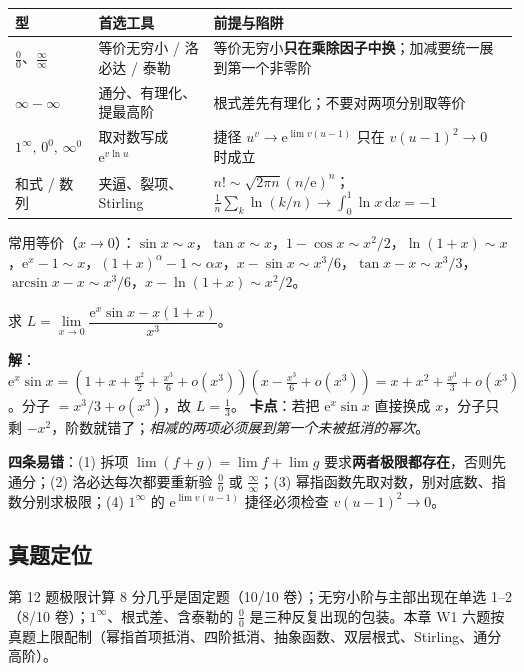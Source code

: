 \documentclass[11pt,a4paper]{ctexart}
\newcommand{\ee}{\mathrm{e}}
\newcommand{\D}{\mathrm{d}}
\begin{document}
\begin{center}
\begin{tabular}{@{}p{3.1cm}p{5.1cm}p{7.0cm}@{}}
\toprule
\textbf{型} & \textbf{首选工具} & \textbf{前提与陷阱} \\
\midrule
$\tfrac00$、$\tfrac{\infty}{\infty}$ & 等价无穷小 / 洛必达 / 泰勒 & 等价无穷小\textbf{只在乘除因子中换}；加减要统一展到第一个非零阶 \\
$\infty-\infty$ & 通分、有理化、提最高阶 & 根式差先有理化；不要对两项分别取等价 \\
$1^\infty,\,0^0,\,\infty^0$ & 取对数写成 $\ee^{v\ln u}$ & 捷径 $u^v\to\ee^{\lim v(u-1)}$ 只在 $v(u-1)^2\to0$ 时成立 \\
和式 / 数列 & 夹逼、裂项、Stirling & $n!\sim\sqrt{2\pi n}(n/\ee)^n$；$\frac1n\sum_k\ln(k/n)\to\int_0^1\ln x\,\D x=-1$ \\
\bottomrule
\end{tabular}
\end{center}

常用等价（$x\to0$）：$\sin x\sim x$，$\tan x\sim x$，$1-\cos x\sim x^2/2$，$\ln(1+x)\sim x$，$\ee^x-1\sim x$，$(1+x)^\alpha-1\sim\alpha x$，$x-\sin x\sim x^3/6$，$\tan x-x\sim x^3/3$，$\arcsin x-x\sim x^3/6$，$x-\ln(1+x)\sim x^2/2$。

\begin{keypoint}
求 $L=\lim\limits_{x\to0}\dfrac{\ee^{x}\sin x-x(1+x)}{x^{3}}$。

\noindent\textbf{解}：$\ee^x\sin x=(1+x+\frac{x^2}{2}+\frac{x^3}{6}+o(x^3))(x-\frac{x^3}{6}+o(x^3))
=x+x^{2}+\frac{x^{3}}{3}+o(x^{3})$。分子 $=x^{3}/3+o(x^{3})$，故 $L=\boxed{\tfrac13}$。
\textbf{卡点}：若把 $\ee^x\sin x$ 直接换成 $x$，分子只剩 $-x^2$，阶数就错了；\emph{相减的两项必须展到第一个未被抵消的幂次}。
\end{keypoint}

\noindent\textbf{四条易错}：(1) 拆项 $\lim(f+g)=\lim f+\lim g$ 要求\textbf{两者极限都存在}，否则先通分；(2) 洛必达每次都要重新验 $\tfrac00$ 或 $\tfrac{\infty}{\infty}$；(3) 幂指函数先取对数，别对底数、指数分别求极限；(4) $1^\infty$ 的 $\ee^{\lim v(u-1)}$ 捷径必须检查 $v(u-1)^2\to0$。

\subsection{真题定位}
第 12 题极限计算 8 分几乎是固定题（10/10 卷）；无穷小阶与主部出现在单选 1--2（8/10 卷）；$1^\infty$、根式差、含泰勒的 $\tfrac00$ 是三种反复出现的包装。本章 W1 六题按真题上限配制（幂指首项抵消、四阶抵消、抽象函数、双层根式、Stirling、通分高阶）。
\end{document}
